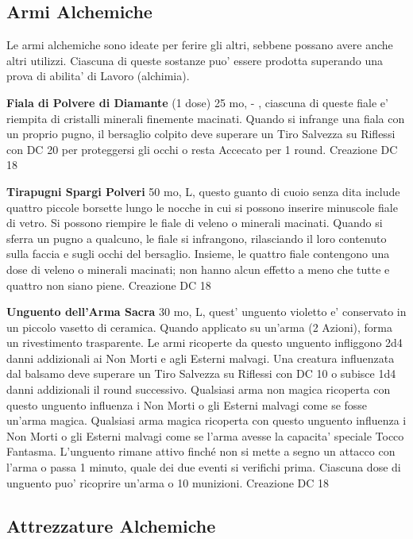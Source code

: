 \documentclass[a4paper,11pt,twoside,openany]{book}
\begin{document}
{		\pagebreak
		
		\subsection{Armi Alchemiche}
		
		\label{armi-alchemiche}
		
		Le armi alchemiche sono ideate per ferire gli altri, sebbene possano avere anche altri utilizzi. Ciascuna di queste sostanze puo' essere prodotta superando una prova di abilita' di Lavoro (alchimia).
		
		\textbf{Fiala di Polvere di Diamante} (1 dose) 25 mo, - , ciascuna di queste fiale e' riempita di cristalli minerali finemente macinati. Quando si infrange una fiala con un proprio pugno, il bersaglio colpito deve superare un Tiro Salvezza su Riflessi con DC 20 per proteggersi gli occhi o resta Accecato per 1 round. Creazione DC 18
		
		\textbf{Tirapugni Spargi Polveri} 50 mo, L, questo guanto di cuoio senza dita include quattro piccole borsette lungo le nocche in cui si possono inserire minuscole fiale di vetro. Si possono riempire le fiale di veleno o minerali macinati. 
		Quando si sferra un pugno a qualcuno, le fiale si infrangono, rilasciando il loro contenuto sulla faccia e sugli occhi del bersaglio. Insieme, le quattro fiale contengono una dose di veleno o minerali macinati; non hanno alcun effetto a meno che tutte e quattro non siano piene. Creazione DC 18
		
		\textbf{Unguento dell'Arma Sacra} 30 mo, L, quest' unguento violetto e' conservato in un piccolo vasetto di ceramica. Quando applicato su un'arma (2 Azioni), forma un rivestimento trasparente. Le armi ricoperte da questo unguento infliggono 2d4 danni addizionali ai Non Morti e agli Esterni malvagi. 
		Una creatura influenzata dal balsamo deve superare un Tiro Salvezza su Riflessi con DC 10 o subisce 1d4 danni addizionali il round successivo. Qualsiasi arma non magica ricoperta con questo unguento influenza i Non Morti o gli Esterni malvagi come se fosse un'arma magica. Qualsiasi arma magica ricoperta con questo unguento influenza i Non Morti o gli Esterni malvagi come se l'arma avesse la capacita' speciale Tocco Fantasma. L'unguento rimane attivo finché non si mette a segno un attacco con l'arma o passa 1 minuto, quale dei due eventi si verifichi prima. Ciascuna dose di unguento puo' ricoprire un'arma o 10 munizioni. Creazione DC 18
		
		\subsection{Attrezzature Alchemiche}
		
}
\end{document}

